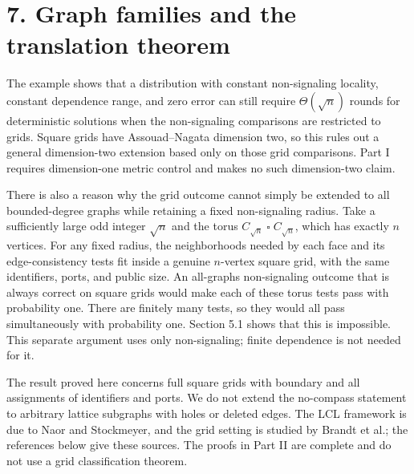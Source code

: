 \documentclass[11pt,a4paper]{article}
\begin{document}
\section{7. Graph families and the translation theorem}\label{grid-relation-to-part-one}

The example shows that a distribution with constant non-signaling locality, constant dependence range, and zero error can still require \(\Theta(\sqrt n)\) rounds for deterministic solutions when the non-signaling comparisons are restricted to grids.
Square grids have Assouad--Nagata dimension two, so this rules out a general dimension-two extension based only on those grid comparisons.
Part I requires dimension-one metric control and makes no such dimension-two claim.

There is also a reason why the grid outcome cannot simply be extended to all bounded-degree graphs while retaining a fixed non-signaling radius.
Take a sufficiently large odd integer \(\sqrt n\) and the torus \(C_{\sqrt n}\mathbin{\square}C_{\sqrt n}\), which has exactly \(n\) vertices.
For any fixed radius, the neighborhoods needed by each face and its edge-consistency tests fit inside a genuine \(n\)-vertex square grid, with the same identifiers, ports, and public size.
An all-graphs non-signaling outcome that is always correct on square grids would make each of these torus tests pass with probability one.
There are finitely many tests, so they would all pass simultaneously with probability one.
Section 5.1 shows that this is impossible.
This separate argument uses only non-signaling; finite dependence is not needed for it.

The result proved here concerns full square grids with boundary and all assignments of identifiers and ports.
We do not extend the no-compass statement to arbitrary lattice subgraphs with holes or deleted edges.
The LCL framework is due to Naor and Stockmeyer, and the grid setting is studied by Brandt et al.; the references below give these sources.
The proofs in Part II are complete and do not use a grid classification theorem.

\clearpage
\end{document}
